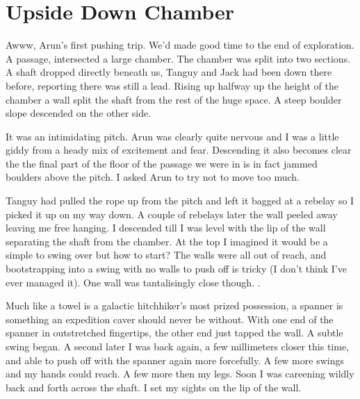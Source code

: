 \section{Upside Down Chamber}

\begin{marginfigure}
\end{marginfigure}

Awww, Arun's first pushing trip. We'd made good time to the end of exploration. A passage,  intersected a large chamber. The chamber was split into two sections. A shaft dropped directly beneath us, Tanguy and Jack had been down there before, reporting there was still a lead. Rising up halfway up the height of the chamber a wall split the shaft from the rest of the huge space. A steep boulder slope descended on the other side.

It was an intimidating pitch. Arun was clearly quite nervous and I was a little giddy from a heady mix of excitement and fear. Descending it also becomes clear the the final part of the floor of the passage we were in is in fact jammed boulders above the pitch. I asked Arun to try not to move too much.

Tanguy had pulled the rope up from the pitch and left it bagged at a rebelay so I picked it up on my way down. A couple of rebelays later the wall peeled away leaving me free hanging. I descended till I was level with the lip of the wall separating the shaft from the chamber. At the top I imagined it would be a simple to swing over but how to start? The walls were all out of reach, and bootstrapping into a swing with no walls to push off is tricky (I don't think I've ever managed it). One wall was tantalisingly close though. .

Much like a towel is a galactic hitchhiker's most prized possession, a spanner is something an expedition caver should never be without. With one end of the spanner in outstretched fingertips, the other end just tapped the wall. A subtle swing began. A second later I was back again, a few millimeters closer this time, and able to push off with the spanner again more forcefully. A few more swings and my hands could reach. A few more then my legs. Soon I was careening wildly back and forth across the shaft. I set my sights on the lip of the wall. 

